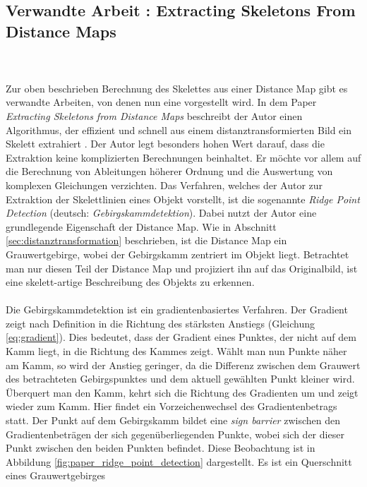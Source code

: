 \subsection{Verwandte Arbeit \cite{extracting_skeletons_distancemaps}: Extracting Skeletons From Distance Maps}
\label{subsec:distancemap_verwandt}
\\\\ 
Zur oben beschrieben Berechnung des Skelettes aus einer Distance Map gibt es verwandte Arbeiten, von denen nun eine vorgestellt wird. 
In dem Paper \emph{Extracting Skeletons from Distance Maps} beschreibt der Autor einen Algorithmus, der effizient und schnell
aus einem distanztransformierten Bild ein Skelett extrahiert \cite{extracting_skeletons_distancemaps}. Der Autor legt besonders hohen Wert darauf, dass die Extraktion keine komplizierten Berechnungen beinhaltet. Er möchte vor allem auf die Berechnung
von Ableitungen höherer Ordnung und die Auswertung von komplexen Gleichungen verzichten. Das Verfahren, welches der Autor zur 
Extraktion der Skelettlinien eines Objekt vorstellt, ist die sogenannte \emph{Ridge Point Detection} (deutsch: \emph{Gebirgskammdetektion}). Dabei nutzt der Autor eine grundlegende Eigenschaft der Distance Map. Wie in Abschnitt \ref{sec:distanztransformation} beschrieben, ist die Distance Map ein Grauwertgebirge, wobei der Gebirgskamm zentriert im Objekt liegt. Betrachtet man nur diesen Teil der Distance Map und projiziert ihn auf das Originalbild, 
ist eine skelett-artige Beschreibung des Objekts zu erkennen.\\\\
Die Gebirgskammdetektion ist ein gradientenbasiertes Verfahren. Der Gradient zeigt nach Definition in die Richtung des stärksten Anstiegs (Gleichung \ref{eq:gradient}). Dies bedeutet, dass der Gradient eines Punktes, der nicht auf dem Kamm liegt, in die Richtung des Kammes zeigt. Wählt man nun Punkte näher am Kamm, so wird der Anstieg
geringer, da die Differenz zwischen dem Grauwert des betrachteten Gebirgspunktes und dem aktuell gewählten Punkt kleiner wird. Überquert man den Kamm, kehrt sich die Richtung des Gradienten um und zeigt wieder zum Kamm. Hier findet ein Vorzeichenwechsel des Gradientenbetrags statt. Der Punkt auf dem Gebirgskamm bildet eine \emph{sign barrier} zwischen den Gradientenbeträgen der sich gegenüberliegenden Punkte, wobei sich der dieser Punkt zwischen den beiden Punkten befindet. Diese
Beobachtung ist in Abbildung \ref{fig:paper_ridge_point_detection} dargestellt. Es ist ein Querschnitt eines Grauwertgebirges
